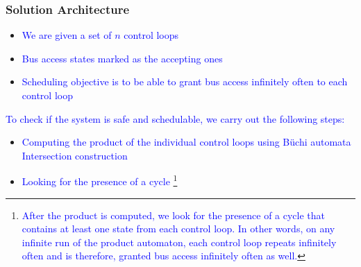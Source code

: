 \begin{frame}
\frametitle{ Solution Architecture}
\begin{itemize}
   \item \tiny{\textcolor{blue}{ We are given a set of $n$ control loops}}
 \item \tiny{\textcolor{blue}{ Bus access states marked as the accepting ones}}
 \item \tiny{\textcolor{blue}{Scheduling objective is to be able to grant bus access infinitely often to each control loop}}
\end{itemize}
\tiny{\textcolor{blue}{To check if the system is safe and schedulable, we carry out the following steps:}}
    \begin{itemize}
       \item \tiny{\textcolor{blue}{Computing the product of the individual control loops using B\"{u}chi automata
                                      Intersection construction}}
        \item \tiny{\textcolor{blue}{Looking for the presence of a cycle \footnote{\tiny{\textcolor{blue}{
                                    After the product is computed, we look for the presence of a cycle that
                                     contains at least one state from each control loop. In other words, on any
                                      infinite run of the product automaton, each control loop repeats infinitely
                                   often and is therefore, granted bus access infinitely often as well.}}}}}

\end{itemize}

\end{frame}

